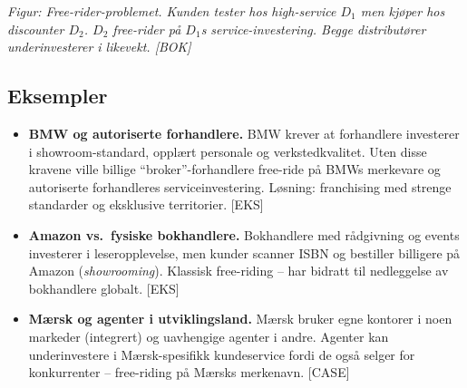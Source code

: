 \begin{center}
\end{center}
\textit{Figur: Free-rider-problemet. Kunden tester hos high-service $D_1$ men kjøper hos discounter $D_2$. $D_2$ free-rider på $D_1$s service-investering. Begge distributører underinvesterer i likevekt. [BOK]}

\subsection*{Eksempler}
\begin{itemize}\setlength{\itemsep}{2pt}
\item \textbf{BMW og autoriserte forhandlere.} BMW krever at forhandlere investerer i showroom-standard, opplært personale og verkstedkvalitet. Uten disse kravene ville billige ``broker''-forhandlere free-ride på BMWs merkevare og autoriserte forhandleres serviceinvestering. Løsning: franchising med strenge standarder og eksklusive territorier. [EKS]
\item \textbf{Amazon vs.\ fysiske bokhandlere.} Bokhandlere med rådgivning og events investerer i leseropplevelse, men kunder scanner ISBN og bestiller billigere på Amazon (\emph{showrooming}). Klassisk free-riding -- har bidratt til nedleggelse av bokhandlere globalt. [EKS]
\item \textbf{Mærsk og agenter i utviklingsland.} Mærsk bruker egne kontorer i noen markeder (integrert) og uavhengige agenter i andre. Agenter kan underinvestere i Mærsk-spesifikk kundeservice fordi de også selger for konkurrenter -- free-riding på Mærsks merkenavn. [CASE]
\end{itemize}


